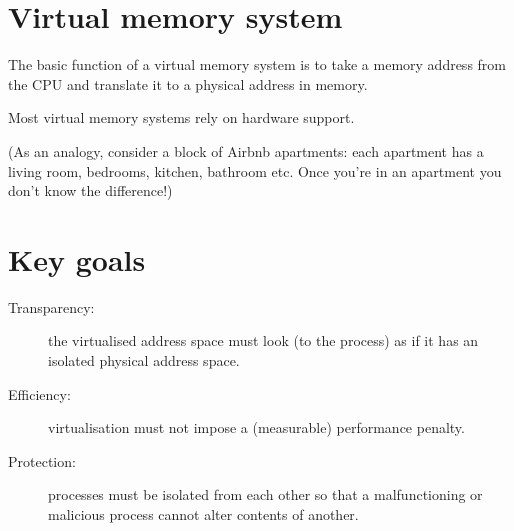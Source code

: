 \section{Virtual memory system}

The basic function of a virtual memory system is to take a memory address from the CPU and translate it to a physical address in memory.

Most virtual memory systems rely on hardware support.

(As an analogy, consider a block of Airbnb apartments: each apartment has a living room, bedrooms, kitchen, bathroom etc.  Once you're in an apartment you don't know the difference!)

\section{Key goals}

\begin{description}
\item[Transparency:] the virtualised address space must look (to the process) as if it has an isolated physical address space.
\item[Efficiency:] virtualisation must not impose a (measurable) performance penalty. 
\item[Protection:] processes must be isolated from each other so that a malfunctioning or malicious process cannot alter contents of another. 
\end{description}


